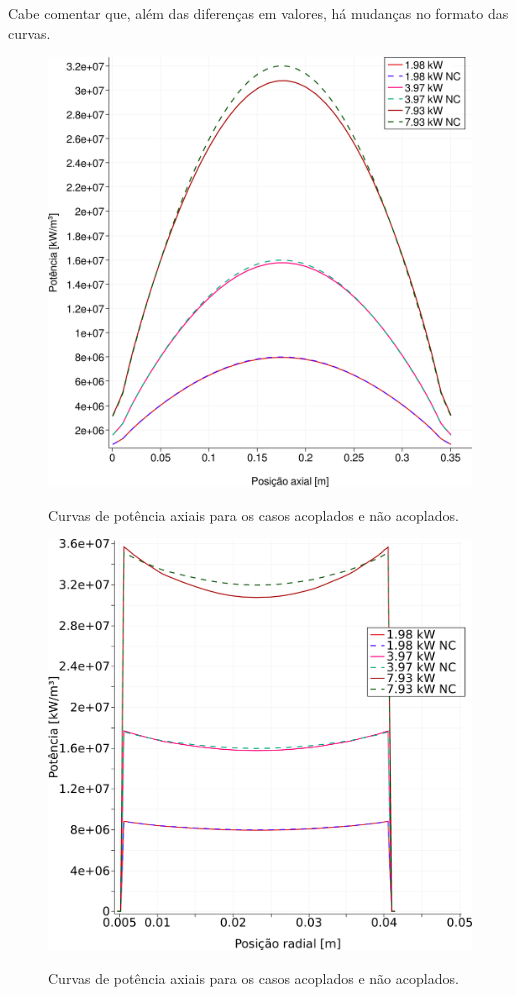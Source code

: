 Cabe comentar que, além das diferenças em valores, há mudanças no formato das curvas.


\begin{figure}[htb]
  \caption{Curvas de potência axiais para os casos acoplados e não acoplados.}
  \centering\includegraphics[scale=0.5]{figuras/Q_all_z_square_port.png}
  \label{fig:Q_all_z}
\end{figure}

\begin{figure}[htb]
  \caption{Curvas de potência axiais para os casos acoplados e não acoplados.}
  \centering\includegraphics[scale=0.5]{figuras/Q_all_x_square_port.png}
  \label{fig:Q_all_x}
\end{figure}
  
